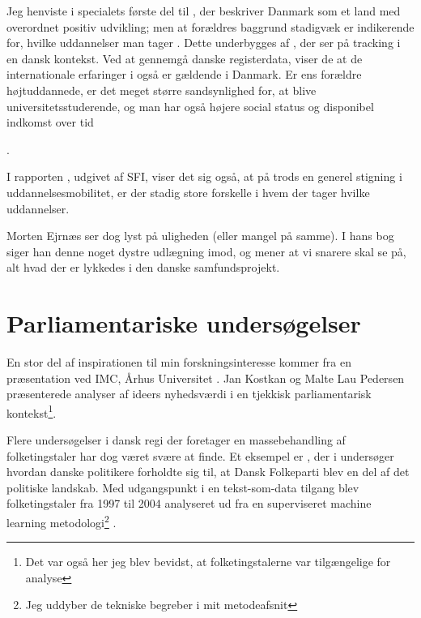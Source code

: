 Jeg henviste i specialets første del til \citeauthor{munkSocialUlighedOg2014}, der beskriver Danmark som et land med overordnet positiv udvikling; men at forældres baggrund stadigvæk er indikerende for, hvilke uddannelser man tager \autocite{munkSocialUlighedOg2014}.
Dette underbygges af \citeauthor{felsbirkelundStructureCausesConsequencesInprogress}, der ser på tracking i en dansk kontekst.
Ved at gennemgå danske registerdata, viser de at de internationale erfaringer i også er gældende i Danmark.
Er ens forældre højtuddannede, er det meget større sandsynlighed for, at blive universitetsstuderende, og man har også højere social status og disponibel indkomst over tid {\autocite{felsbirkelundStructureCausesConsequencesInprogress}.

I rapporten , udgivet af SFI, viser det sig også, at på trods en generel stigning i uddannelsesmobilitet, er der stadig store forskelle i hvem der tager hvilke uddannelser.

Morten Ejrnæs ser dog lyst på uligheden (eller mangel på samme).
I hans bog siger han denne noget dystre udlægning imod, og mener at vi snarere skal se på, alt hvad der er lykkedes i den danske samfundsprojekt.

\section{Parliamentariske undersøgelser}\label{sec:review-parl}

En stor del af inspirationen til min forskningsinteresse kommer fra en præsentation ved IMC, Århus Universitet \autocite{interactingmindscentreaarhusuniversityNLPWorkshopIMC2019}. Jan Kostkan og Malte Lau Pedersen præsenterede analyser af ideers nyhedsværdi i en tjekkisk parliamentarisk kontekst\footnote{Det var også her jeg blev bevidst, at folketingstalerne var tilgængelige for analyse}.

Flere undersøgelser i dansk regi der foretager en massebehandling af folketingstaler har dog været svære at finde.
Et eksempel er \citeauthor{hjorthEstablishmentResponsesPopulist2018}, der i  undersøger hvordan danske politikere forholdte sig til, at Dansk Folkeparti blev en del af det politiske landskab.
Med udgangspunkt i en tekst-som-data tilgang blev folketingstaler fra 1997 til 2004 analyseret ud fra en superviseret machine learning metodologi\footnote{Jeg uddyber de tekniske begreber i mit metodeafsnit} \autocite{hjorthEstablishmentResponsesPopulist2018}.

}
